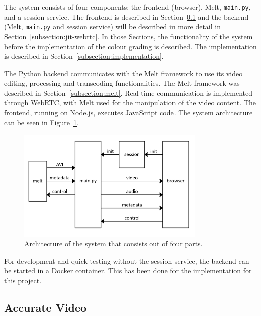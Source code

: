 \documentclass[../MasterThesis.tex]{subfiles}
\begin{document}
The system consists of four components: the frontend (browser), Melt, \texttt{main.py}, and a session service. The frontend is described in Section~\ref{subsection:accuratevideo} and the backend (Melt, \texttt{main.py} and session service) will be described in more detail in Section~\ref{subsection:jit-webrtc}. 
In those Sections, the functionality of the system before the implementation of the colour grading is described. The implementation is described in Section~\ref{subsection:implementation}.


The Python backend communicates with the Melt framework to use its video editing, processing and transcoding functionalities. The Melt framework was described in Section~\ref{subsection:melt}. Real-time communication is implemented through WebRTC, with Melt used for the manipulation of the video content. 
The frontend, running on Node.js, executes JavaScript code. 
The system architecture can be seen in Figure~\ref{figure:SA}.



\begin{figure}[H]
	\centering
	\includegraphics[width=0.8\textwidth]{IM3.png}
	\caption[System architecture]{Architecture of the system that consists out of four parts.}
	\label{figure:SA}
\end{figure}


For development and quick testing without the session service, the backend can be started in a Docker container. This has been done for the implementation for this project.







\subsection{Accurate Video} \label{subsection:accuratevideo}
\end{document}
